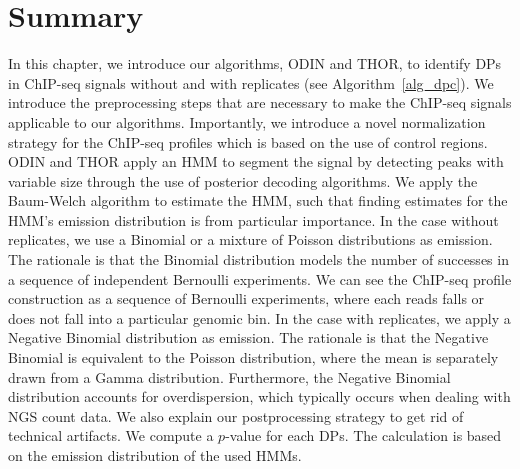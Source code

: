 \section{Summary}
In this chapter, we introduce our algorithms, ODIN and THOR, to identify DPs in ChIP-seq signals without and with replicates (see Algorithm~\ref{alg_dpc}).
We introduce the preprocessing steps that are necessary to make the ChIP-seq signals applicable to our algorithms.
Importantly, we introduce a novel normalization strategy for the ChIP-seq profiles which is based on the use of control regions.
ODIN and THOR apply an HMM to segment the signal by detecting peaks with variable size through the use of posterior decoding algorithms.
We apply the Baum-Welch algorithm to estimate the HMM, such that finding estimates for the HMM's emission distribution is from particular importance.
In the case without replicates, we use a Binomial or a mixture of Poisson distributions as emission.
The rationale is that the Binomial distribution models the number of successes in a sequence of independent Bernoulli experiments.
We can see the ChIP-seq profile construction as a sequence of Bernoulli experiments, where each reads falls or does not fall into a particular genomic bin.
In the case with replicates, we apply a Negative Binomial distribution as emission.
The rationale is that the Negative Binomial is equivalent to the Poisson distribution, where the mean is separately drawn from a Gamma distribution.
Furthermore, the Negative Binomial distribution accounts for overdispersion, which typically occurs when dealing with NGS count data.
We also explain our postprocessing strategy to get rid of technical artifacts.
We compute a $p$-value for each DPs.
The calculation is based on the emission distribution of the used HMMs.


